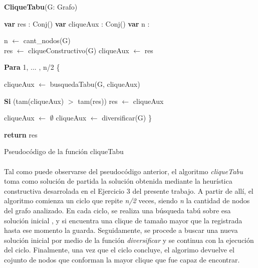 \textbf{CliqueTabu}(G: Grafo) \\
\begin{algorithm}[H]
\footnotesize 
\linesnumbered
\incmargin{3em}

	\BlankLine
	\textbf{var} res : Conj(\entero)  									
	\textbf{var} cliqueAux : Conj(\entero) 								
	\textbf{var} n : \entero												{}

	\BlankLine \BlankLine
	n $\leftarrow$ cant\_nodos(G) \\										
	res $\leftarrow$ cliqueConstructivo(G)									
	cliqueAux $\leftarrow$ res											

	\BlankLine \BlankLine
	\textbf{Para} 1, ... , n/2 \{												

	\BlankLine \BlankLine
	\tab cliqueAux $\leftarrow$ busquedaTabu(G, cliqueAux)			

	\BlankLine \BlankLine		
	\tab \textbf{Si} (tam(cliqueAux) $>$ tam(res))						
	\tab \tab	res $\leftarrow$ cliqueAux								

	\BlankLine \BlankLine		
	cliqueAux $\leftarrow$ $\emptyset$								
	cliqueAux $\leftarrow$ diversificar(G)								
	\}
	
	\BlankLine \BlankLine		
	\textbf{return} res													

\caption{Pseudocódigo de la función cliqueTabu}
\normalsize
\end{algorithm}

\paragraph{}
Tal como puede observarse del pseudocódigo anterior, el algoritmo \textit{cliqueTabu} toma como solución de partida la solución obtenida mediante la heurística constructiva desarrolada en el Ejercicio 3 del presente trabajo. A partir de allí, el algoritmo comienza un ciclo que repite \textit{n/2} veces, siendo \textit{n} la cantidad de nodos del grafo analizado. En cada ciclo, se realiza una búsqueda tabú sobre esa solución inicial , y si encuentra una clique de tamaño mayor que la registrada hasta ese momento la guarda. Seguidamente, se procede a buscar una nueva solución inicial por medio de la función \textit{diversificar} y se continua con la ejecución del ciclo. Finalmente, una vez que el ciclo concluye, el algorimo devuelve el cojunto de nodos que conforman la mayor clique que fue capaz de encontrar.

